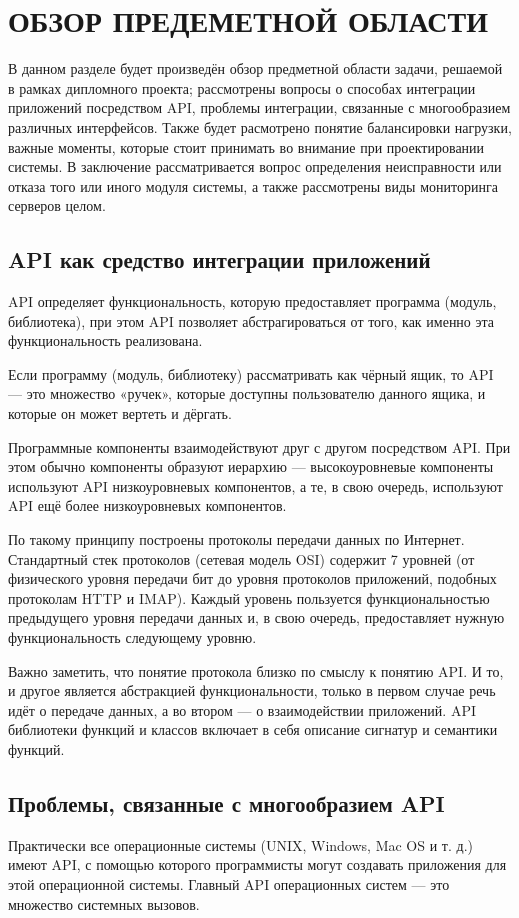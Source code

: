 \section{ОБЗОР ПРЕДЕМЕТНОЙ ОБЛАСТИ}

В данном разделе будет произведён обзор предметной области задачи, решаемой в рамках дипломного проекта; рассмотрены вопросы о способах интеграции приложений посредством API, проблемы интеграции, связанные с многообразием различных интерфейсов. Также будет расмотрено понятие балансировки нагрузки, важные моменты, которые стоит принимать во внимание при проектировании системы. В заключение рассматривается вопрос определения неисправности или отказа того или иного модуля системы, а также рассмотрены виды мониторинга серверов целом.

\subsection{API как средство интеграции приложений}
API определяет функциональность, которую предоставляет программа (модуль, библиотека), при этом API позволяет абстрагироваться от того, как именно эта функциональность реализована.

Если программу (модуль, библиотеку) рассматривать как чёрный ящик, то API — это множество «ручек», которые доступны пользователю данного ящика, и которые он может вертеть и дёргать.

Программные компоненты взаимодействуют друг с другом посредством API. При этом обычно компоненты образуют иерархию — высокоуровневые компоненты используют API низкоуровневых компонентов, а те, в свою очередь, используют API ещё более низкоуровневых компонентов.

По такому принципу построены протоколы передачи данных по Интернет. Стандартный стек протоколов (сетевая модель OSI) содержит 7 уровней (от физического уровня передачи бит до уровня протоколов приложений, подобных протоколам HTTP и IMAP). Каждый уровень пользуется функциональностью предыдущего уровня передачи данных и, в свою очередь, предоставляет нужную функциональность следующему уровню.

Важно заметить, что понятие протокола близко по смыслу к понятию API. И то, и другое является абстракцией функциональности, только в первом случае речь идёт о передаче данных, а во втором — о взаимодействии приложений.
API библиотеки функций и классов включает в себя описание сигнатур и семантики функций.


\subsection{Проблемы, связанные с многообразием API}
Практически все операционные системы (UNIX, Windows, Mac OS и т. д.) имеют API, с помощью которого программисты могут создавать приложения для этой операционной системы. Главный API операционных систем — это множество системных вызовов.

